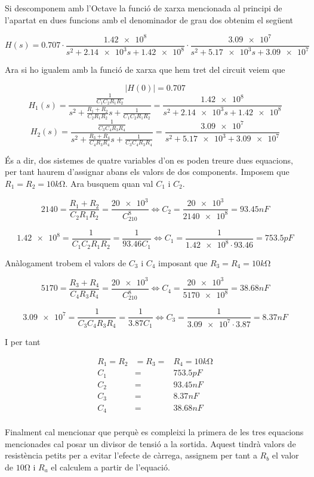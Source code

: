 \documentclass[12pt, a4papre]{article}
\begin{document}
	Si descomponem amb l'Octave la funció de xarxa mencionada al principi de l'apartat en dues funcions amb el denominador de grau dos obtenim el següent
	
	\[
		H(s)=0.707\cdot\frac{\num{1.42e8}}{s^2+\num{2.14e3}s+\num{1.42e8}} \cdot \frac{\num{3.09e7}}{s^2+\num{5.17e3}s+\num{3.09e7}}
	\]
	
	Ara si ho igualem amb la funció de xarxa que hem tret del circuit veiem que
	
	\[
		|H(0)|=0.707
	\]
	\[
		H_1(s)=\frac{\frac{1}{C_1C_2R_1R_2}}{s^2+\frac{R_1+R_2}{C_2R_1R_2}s+\frac{1}{C_1C_2R_1R_2}}=
		\frac{\num{1.42e8}}{s^2+\num{2.14e3}s+\num{1.42e8}}
	\]
	\[
		H_2(s)=\frac{\frac{1}{C_3C_4R_3R_4}}{s^2+\frac{R_3+R_4}{C_4R_3R_4}s+\frac{1}{C_3C_4R_3R_4}}=
		\frac{\num{3.09e7}}{s^2+\num{5.17e3}+\num{3.09e7}}
	\]
	
	És a dir, dos sistemes de quatre variables d'on es poden treure dues equacions, per tant haurem d'assignar abans els valors de dos components. Imposem que
	$R_1=R_2=10\si{k\ohm}$. Ara busquem quan val $C_1$ i $C_2$.
	
	\[
		2140=\frac{R_1+R_2}{C_2R_1R_2}=\frac{\num{20e3}}{C_210^8} \iff C_2=\frac{\num{20e3}}{\num{2140e8}}=93.45nF
	\]
	
	\[
		\num{1.42e8}=\frac{1}{C_1C_2R_1R_2}=\frac{1}{93.46C_1} \iff C_1=\frac{1}{\num{1.42e8}\cdot93.46}=753.5pF
	\]
	
	Anàlogament trobem el valors de $C_3$ i $C_4$ imposant que $R_3=R_4=10\si{k\ohm}$
	
	\[
		5170=\frac{R_3+R_4}{C_4R_3R_4}=\frac{\num{20e3}}{C_210^8} \iff C_4=\frac{\num{20e3}}{\num{5170e8}}=38.68nF
	\]
	
	\[
		\num{3.09e7}=\frac{1}{C_3C_4R_3R_4}=\frac{1}{3.87C_1} \iff C_3=\frac{1}{\num{3.09e7}\cdot3.87}=8.37nF
	\]
	
	I per tant

	\begin{equation} \label{eq1}
	\boxed{
	\begin{array}{rcl}
		R_1=R_2&=R_3=&R_4=10\si{k\ohm} \\
		C_1 & =& 753.5pF \\
		C_2 & =& 93.45nF \\
		C_3 & = &8.37nF \\
		C_4 & = &38.68nF \\
	\end{array}
	}
	\end{equation}
	
	Finalment cal mencionar que perquè es compleixi la primera de les tres equacions mencionades cal posar un divisor de tensió a la sortida.
	Aquest tindrà valors de resistència petits per a evitar l'efecte de càrrega, assignem per tant a $R_b$ el valor de $10\si{\ohm}$ i $R_a$ el calculem
	a partir de l'equació.
		
\end{document}
